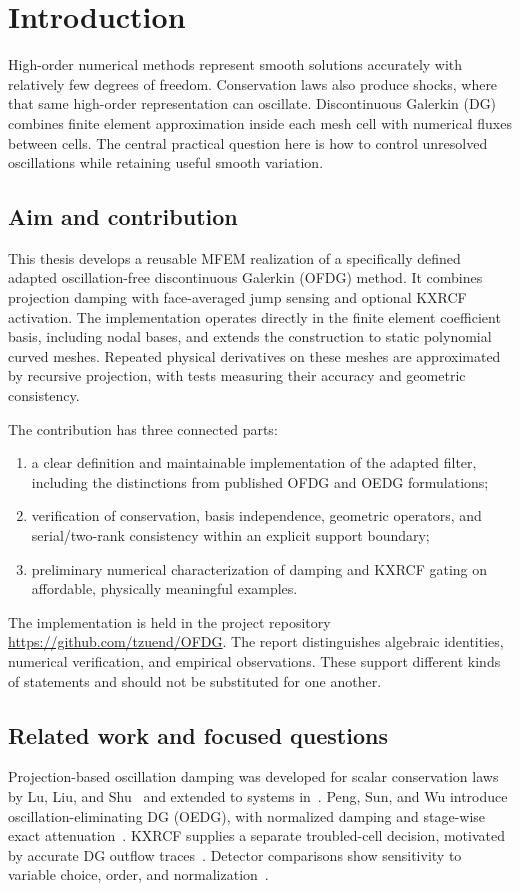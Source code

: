 \chapter{Introduction}
\label{chap:introduction}
High-order numerical methods represent smooth solutions accurately with
relatively few degrees of freedom. Conservation laws also produce shocks,
where that same high-order representation can oscillate. Discontinuous Galerkin
(DG) combines finite element approximation inside each mesh cell with numerical
fluxes between cells. The central practical question here is how to control
unresolved oscillations while retaining useful smooth variation.

\section{Aim and contribution}
This thesis develops a reusable MFEM realization of a specifically defined
adapted oscillation-free discontinuous Galerkin (OFDG) method. It combines projection damping with face-averaged jump
sensing and optional KXRCF activation. The implementation operates directly in
the finite element coefficient basis, including nodal bases, and extends the
construction to static polynomial curved meshes. Repeated physical derivatives
on these meshes are approximated by recursive projection, with tests measuring
their accuracy and geometric consistency.

The contribution has three connected parts:
\begin{enumerate}
 \item a clear definition and maintainable implementation of the adapted filter,
 including the distinctions from published OFDG and OEDG formulations;
 \item verification of conservation, basis independence, geometric operators,
 and serial/two-rank consistency within an explicit support boundary;
 \item preliminary numerical characterization of damping and KXRCF gating on
 affordable, physically meaningful examples.
\end{enumerate}
The implementation is held in the project repository
\url{https://github.com/tzuend/OFDG}. The report distinguishes algebraic
identities, numerical verification, and empirical observations. These support
different kinds of statements and should not be substituted for one another.

\section{Related work and focused questions}
Projection-based oscillation damping was developed for scalar conservation laws
by Lu, Liu, and Shu~\cite{LuEtAl2021} and extended to systems
in~\cite{LiuEtAl2022}. Peng, Sun, and Wu introduce oscillation-eliminating DG (OEDG), with
normalized damping and stage-wise exact attenuation~\cite{PengEtAl2024}.
KXRCF supplies a separate troubled-cell decision, motivated by accurate DG
outflow traces~\cite{KrivodonovaEtAl2004}. Detector comparisons show sensitivity
to variable choice, order, and normalization~\cite{QiuShu2005,FuShu2017}.

